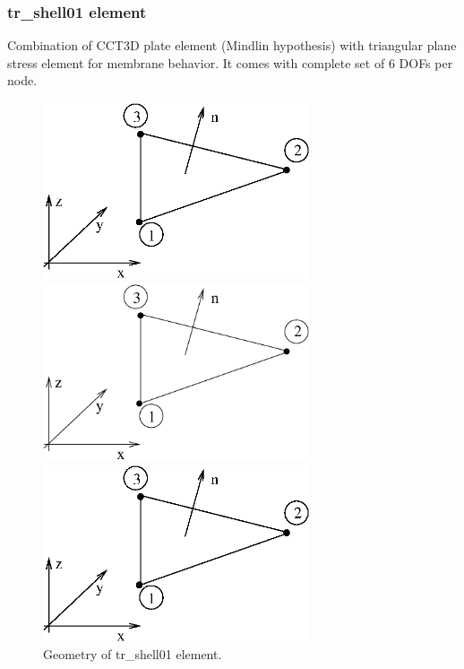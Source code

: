 \documentclass[a4paper]{article}
\begin{document}
\subsubsection {tr\_shell01 element}
Combination of CCT3D plate element (Mindlin hypothesis) with triangular plane stress element
for membrane behavior. It comes with complete set of 6 DOFs per node.
\begin{figure}[tb]
\begin{htmlonly}
  \centerline{\includegraphics[width=0.7\textwidth]{trshell_lin.eps}}
\end{htmlonly}
\ifpdf
 \centerline{\includegraphics[width=0.7\textwidth]{trshell_lin.pdf}}
\else
 \centerline{\includegraphics[width=0.7\textwidth]{trshell_lin.eps}}
\fi
\caption{Geometry of tr\_shell01 element.}
\end{figure}
\end{document}
